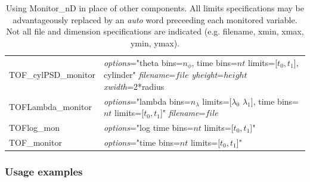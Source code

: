 \begin{table}
\begin{center}
{\begin{tabular}{|p{}|p{}|}
TOF\_cylPSD\_monitor & \textit{options}="theta bins=$n_\phi$, time bins=$nt$ limits=[$t_0, t_1$], cylinder" \textit{filename}=$file$ \textit{yheight}=$height$ \textit{xwidth}=2*radius\\
TOFLambda\_monitor  & \textit{options}="lambda bins=$n_\lambda$ limits=[$\lambda_0$ $\lambda_1$], time bins=$nt$ limits=[$t_0, t_1$]" \textit{filename}=$file$\\
TOFlog\_mon         & \textit{options}="log time bins=$nt$ limits=[$t_0, t_1$]" \\
TOF\_monitor        & \textit{options}="time bins=$nt$ limits=[$t_0, t_1$]" \\
\hline
    \end{tabular}
    \caption{Using Monitor\_nD in place of other components. All limits specifications may be advantageously replaced by an \textit{auto} word preceeding each monitored variable. Not all file and dimension specifications are indicated (e.g. filename, xmin, xmax, ymin, ymax).}
    \label{t:monitor-nd-equiv}
    }
  \end{center}
\end{table}

\subsubsection{Usage examples}

